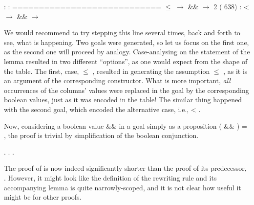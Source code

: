 \coqdoceol
\coqdocemptyline
\coqdocindent{1.00em}
 : \coqdoceol
\coqdocindent{1.00em}
 : \coqdoceol
\coqdocindent{1.00em}
============================\coqdoceol
\coqdocindent{1.50em}
 \ensuremath{\le}  \ensuremath{\rightarrow}  \&\&  \ensuremath{\rightarrow} \coqdoceol
\coqdocnoindent
\coqdoceol
\coqdocnoindent
{} 2 ( 638) :\coqdoceol
\coqdocindent{0.50em}
 <  \ensuremath{\rightarrow}  \&\&  \ensuremath{\rightarrow} 

\coqdocemptyline


We would recommend to try stepping this line several times, back and
forth to see, what is happening. Two goals were generated, so let us
focus on the first one, as the second one will proceed by
analogy. Case-analysing on the statement of the lemma  resulted
in two different ``options'', as one would expect from the shape of the
table. The first, case,  \ensuremath{\le} , resulted in generating the
assumption  \ensuremath{\le} , as it is an argument of the corresponding
constructor. What is more important, \textit{all} occurrences of the columns'
values were replaced in the goal by the corresponding boolean values,
just as it was encoded in the table! The similar thing happened with
the second goal, which encoded the alternative case, i.e.,  < .


Now, considering a boolean value  \&\&  in a goal simply as a
proposition ( \&\& ) = , the proof is trivial by
simplification of the boolean conjunction.


\begin{coqdoccode}
\coqdocemptyline
\coqdocnoindent
{}.\coqdoceol
\coqdocnoindent
{}.\coqdoceol
\coqdocnoindent
{}.\coqdoceol
\coqdocemptyline
\end{coqdoccode}


The proof of  is now indeed significantly shorter than the proof
of its predecessor, . However, it might look like the definition
of the rewriting rule  and its accompanying lemma 
is quite narrowly-scoped, and it is not clear how useful it might be
for other proofs.



